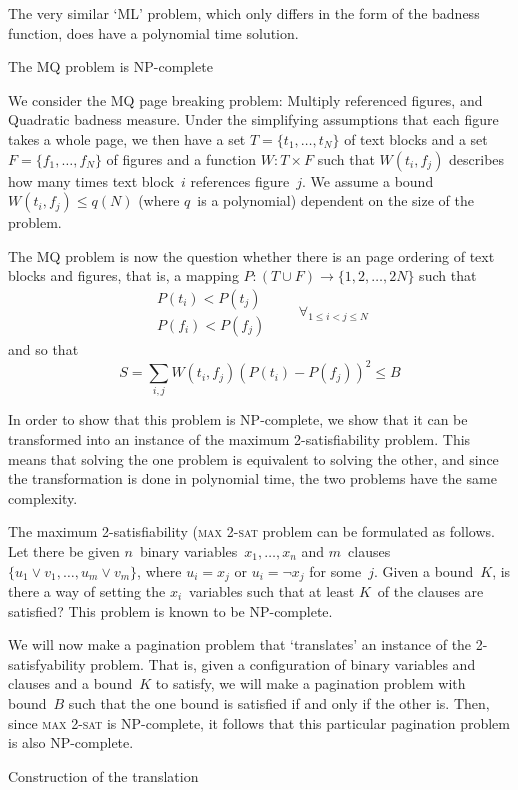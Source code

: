 The very similar `ML' problem, which only differs in the form of
the badness function, does have a polynomial time solution.

 {The MQ problem is NP-complete}

We consider the MQ page breaking problem: Multiply referenced figures,
and Quadratic badness measure. Under the simplifying assumptions that
each figure takes a whole page, we then have a set
$T=\{t_1,\ldots,t_N\}$ of text blocks and a set $F=\{f_1,\ldots,f_N\}$
of figures and a function $W:T\times F$ such that $W(t_i,f_j)$
describes how many times text block~$i$ references figure~$j$.
We assume a bound $W(t_i,f_j)\leq q(N)$ (where $q$~is a polynomial)
dependent on the size of the problem.

The MQ problem is now the question whether there is an page ordering of
text blocks and figures, that is, a mapping $P:(T\cup F)\rightarrow
\{1,2,\ldots,2N\}$ such that
\[ \begin{array}{cc}P(t_i)<P(t_j)\\ P(f_i)<P(f_j)
    \end{array}\qquad\forall_{1\leq i<j\leq N}
\]
and so that
\[ S=\sum_{i,j}W(t_i,f_j)(P(t_i)-P(f_j))^2\leq B \]

In order to show that this problem is NP-complete, we show that it can
be transformed into an instance of the maximum 2-satisfiability problem. This
means that solving the one problem is equivalent to solving the other,
and since the transformation is done in polynomial time, the two
problems have the same complexity.

The maximum 2-satisfiability (\textsc{max 2-sat} problem can be
formulated as follows. Let there be given $n$~binary
variables~$x_1,\ldots,x_n$ and $m$~clauses~$\{u_1\vee v_1,\ldots,
u_m\vee v_m\}$, where $u_i=x_j$ or $u_i=\neg x_j$ for some~$j$. Given
a bound~$K$, is there a way of setting the $x_i$~variables such that
at least $K$~of the clauses are satisfied? This problem is known to be
NP-complete.

We will now make a pagination problem that `translates' an instance of
the 2-satisfyability problem. That is, given a configuration of binary
variables and clauses and a bound~$K$ to satisfy, we will make a
pagination problem with bound~$B$ such that the one bound is satisfied
if and only if the other is. Then, since \textsc{max 2-sat} is
NP-complete, it follows that this particular pagination problem is
also NP-complete.

 {Construction of the translation}

